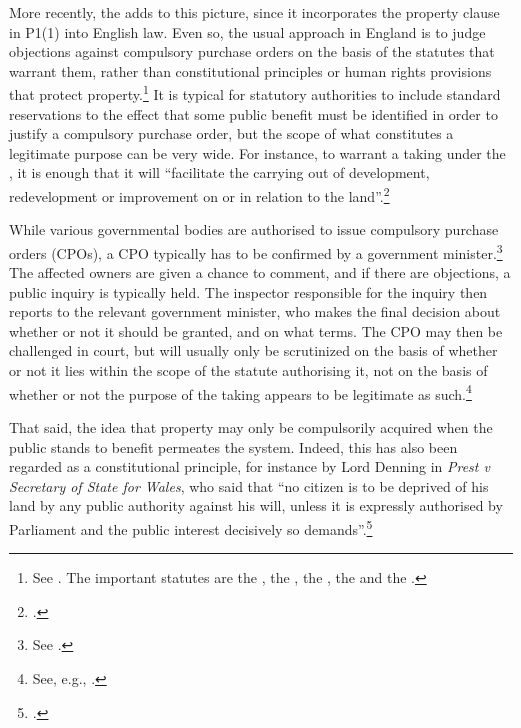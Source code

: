 More recently, the \cite{hra98} adds to this picture, since it incorporates the property clause in P1(1) into English law. Even so, the usual approach in England is to judge objections against compulsory purchase orders on the basis of the statutes that warrant them, rather than constitutional principles or human rights provisions that protect property.\footnote{See \cite[121-132]{waring09}. The important statutes are the \cite{ala81}, the \cite{lca61}, the \cite{cpa65}, the \cite{tcpa90} and the \cite{pcpa04}.} It is typical for statutory authorities to include standard reservations to the effect that some public benefit must be identified in order to justify a compulsory purchase order, but the scope of what constitutes a legitimate purpose can be very wide. For instance, to warrant a taking under the \cite{tcpa90}, it is enough that it will ``facilitate the carrying out of development, redevelopment or improvement on or in relation to the land''.\footcite[226]{tcpa90} 

While various governmental bodies are authorised to issue compulsory purchase orders (CPOs), a CPO typically has to be confirmed by a government minister.\footnote{See \cite[48]{waring09}.} The affected owners are given a chance to comment, and if there are objections, a public inquiry is typically held. The inspector responsible for the inquiry then reports to the relevant government minister, who makes the final decision about whether or not it should be granted, and on what terms. The CPO may then be challenged in court, but will usually only be scrutinized on the basis of whether or not it lies within the scope of the statute authorising it, not on the basis of whether or not the purpose of the taking appears to be legitimate as such.\footnote{See, e.g., \cite[48-49]{waring09}.}

That said, the idea that property may only be compulsorily acquired when the public stands to benefit permeates the system. Indeed, this has also been regarded as a constitutional principle, for instance by Lord Denning in {\it Prest v Secretary of State for Wales}, who said that ``no citizen is to be deprived of his land by any public authority against his will, unless it is expressly authorised by Parliament and the public interest decisively so demands''.\footcite{prest82} %

